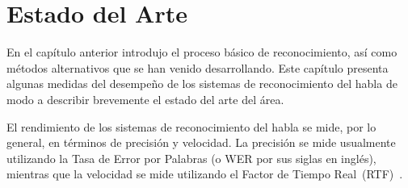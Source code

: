 \chapter{Estado del Arte}
\label{sec:estado-arte}

En el cap\'itulo anterior introdujo el proceso b\'asico de reconocimiento, as\'i como m\'etodos
alternativos que se han venido desarrollando. Este cap\'itulo presenta algunas medidas del desempe\~no 
de los sistemas de reconocimiento del habla de modo a describir brevemente el estado del arte del área.

El rendimiento de los sistemas de reconocimiento del habla se mide, por lo general, en t\'erminos
de precisi\'on y velocidad. La precisi\'on se mide usualmente utilizando la Tasa de Error por Palabras
(o WER por sus siglas en ingl\'es), mientras que la velocidad se mide utilizando el Factor de 
Tiempo \mbox{Real (RTF) \cite{GaikwadAReview2010}}.


